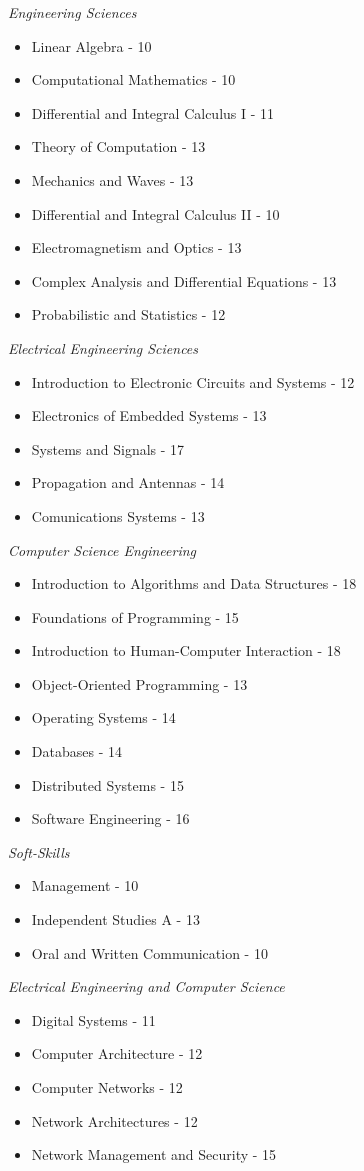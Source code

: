 \textit{Engineering Sciences}
	\begin{itemize}
	  \item Linear Algebra - 10
	  \item Computational Mathematics - 10
	  \item Differential and Integral Calculus I - 11
	  \item Theory of Computation - 13
	  \item Mechanics and Waves - 13
	  \item Differential and Integral Calculus II - 10
	  \item Electromagnetism and Optics - 13
	  \item Complex Analysis and Differential Equations - 13 
	  \item Probabilistic and Statistics - 12
	\end{itemize}


\textit{Electrical Engineering Sciences}
	\begin{itemize}
	  \item Introduction to Electronic Circuits and Systems - 12
	  \item Electronics of Embedded Systems - 13
	  \item Systems and Signals - 17
	  \item Propagation and Antennas - 14
	  \item Comunications Systems - 13
	\end{itemize}


\textit{Computer Science Engineering}
	\begin{itemize}
	  \item Introduction to Algorithms and Data Structures - 18
	  \item Foundations of Programming - 15
	  \item Introduction to Human-Computer Interaction - 18
         \item Object-Oriented Programming - 13
         \item Operating Systems - 14
         \item Databases - 14
	  \item Distributed Systems - 15
	  \item Software Engineering - 16
	\end{itemize}


\textit{Soft-Skills}
	\begin{itemize}
	  \item Management - 10
	  \item Independent Studies A - 13
	  \item Oral and Written Communication - 10
	\end{itemize}


\textit{Electrical Engineering and Computer Science}
	\begin{itemize}
	  \item Digital Systems - 11
	  \item Computer Architecture - 12
	  \item Computer Networks - 12
	\item Network Architectures - 12
	\item  	Network Management and Security - 15

	\end{itemize}
